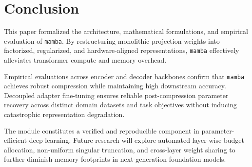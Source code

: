 \section{Conclusion}
This paper formalized the architecture, mathematical formulations, and empirical evaluation of \texttt{mamba}. By restructuring monolithic projection weights into factorized, regularized, and hardware-aligned representations, \texttt{mamba} effectively alleviates transformer compute and memory overhead.

Empirical evaluations across encoder and decoder backbones confirm that \texttt{mamba} achieves robust compression while maintaining high downstream accuracy. Decoupled adapter fine-tuning ensures reliable post-compression parameter recovery across distinct domain datasets and task objectives without inducing catastrophic representation degradation.

The module constitutes a verified and reproducible component in parameter-efficient deep learning. Future research will explore automated layer-wise budget allocation, non-uniform singular truncation, and cross-layer weight sharing to further diminish memory footprints in next-generation foundation models.
